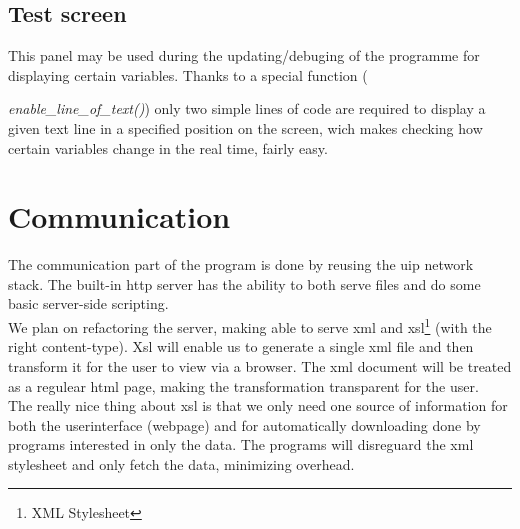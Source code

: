 \subsection{Test screen}
This panel may be used during the updating/debuging of the programme for displaying certain variables. Thanks to a special function ({\textit{enable\_line\_of\_text()}) only two simple lines of code are required to display a given text line in a specified position on the screen, wich makes checking how certain variables change in the real time, fairly easy.

\section{Communication}
The communication part of the program is done by reusing the uip network stack. The built-in http server has the ability to both serve files and do some basic server-side scripting. \\
We plan on refactoring the server, making able to serve xml and xsl\footnote{XML Stylesheet} (with the right content-type). Xsl will enable us to generate a single xml file and then transform it for the user to view via a browser. The xml document will be treated as a regulear html page, making the transformation transparent for the user. \\
The really nice thing about xsl is that we only need one source of information for both the userinterface (webpage) and for automatically downloading done by programs interested in only the data. The programs will disreguard the xml stylesheet and only fetch the data, minimizing overhead.
}
